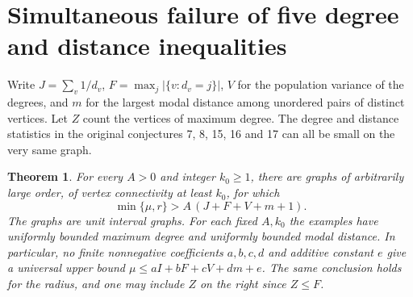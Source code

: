 \documentclass[11pt,a4paper]{article}
\newtheorem{theorem}{Theorem}[section]
\theoremstyle{remark}\newtheorem*{remark}{Remark}
\begin{document}
\section{Simultaneous failure of five degree and distance inequalities}
\label{sec:syn-chains}
Write $J=\sum_v1/d_v$, $F=\max_j|\{v:d_v=j\}|$, $V$ for the population
variance of the degrees, and $m$ for the largest modal distance among
unordered pairs of distinct vertices. Let $Z$ count the vertices of
maximum degree. The degree and distance statistics in the original
conjectures 7, 8, 15, 16 and 17 can all be small on the very same graph.

\begin{theorem}\label{thm:syn-chain}
For every $A>0$ and integer $k_0\ge1$, there are graphs of arbitrarily
large order, of vertex connectivity at least $k_0$, for which
\[
 \min\{\mu,r\}> A\,(J+F+V+m+1).
\]
The graphs are unit interval graphs. For each fixed $A,k_0$ the examples
have uniformly bounded maximum degree and uniformly bounded modal distance.
In particular, no finite nonnegative coefficients $a,b,c,d$ and additive
constant $e$ give a universal upper bound
$\mu\le aI+bF+cV+dm+e$. The same conclusion holds for the radius, and
one may include $Z$ on the right since $Z\le F$.
\end{theorem}
\end{document}
